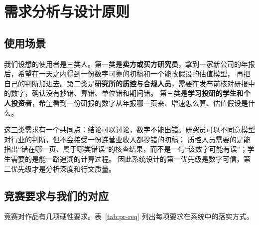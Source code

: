 \chapter{需求分析与设计原则}

\section{使用场景}

我们设想的使用者是三类人。第一类是\textbf{卖方或买方研究员}，拿到一家新公司的年报后，希望在一天之内得到一份数字可靠的初稿和一个能改假设的估值模型，
再把自己的判断加进去。第二类是\textbf{研究所的质控与合规人员}，需要在发布前核对研报中的数字，确认没有抄错、算错、单位错和期间错。
第三类是\textbf{学习投研的学生和个人投资者}，希望看到一份研报的数字从年报哪一页来、增速怎么算、估值假设是什么。

这三类需求有一个共同点：结论可以讨论，数字不能出错。研究员可以不同意模型对行业的判断，但不会接受一份连营业收入都抄错的初稿；
质控人员需要的是能指出“错在哪一页、属于哪类错误”的核查结果，而不是一句“该数字可能有误”；学生需要的是能一路追溯的计算过程。
因此系统设计的第一优先级是数字可信，第二优先级才是分析深度和行文质量。

\section{竞赛要求与我们的对应}

竞赛对作品有几项硬性要求。表~\ref{tab:pr-req} 列出每项要求在系统中的落实方式。

